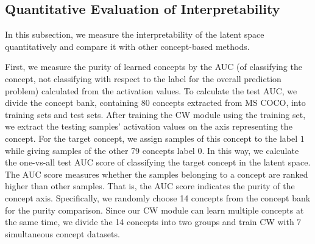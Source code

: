 \documentclass{article}
\begin{document}
\subsection{Quantitative Evaluation of Interpretability}
\label{sec:quantitative_eval}

In this subsection, we measure the interpretability of the latent space quantitatively and compare it with other concept-based methods. 

First, we measure the purity of learned concepts by the AUC (of classifying the concept, not classifying with respect to the label for the overall prediction problem) calculated from the activation values. To calculate the test AUC, we divide the concept bank, containing 80 concepts extracted from MS COCO, into training sets and test sets. After training the CW module using the training set, we extract the testing samples' activation values on the axis representing the concept. For the target concept, we assign samples of this concept to the label $1$ while giving samples of the other 79 concepts label $0$. In this way, we calculate the one-vs-all test AUC score of classifying the target concept in the latent space. The AUC score measures whether the samples belonging to a concept are ranked higher than other samples. That is, the AUC score indicates the purity of the concept axis. Specifically, we randomly choose 14 concepts from the concept bank for the purity comparison. Since our CW module can learn multiple concepts at the same time, we divide the 14 concepts into two groups and train CW with 7 simultaneous concept datasets.
\end{document}
